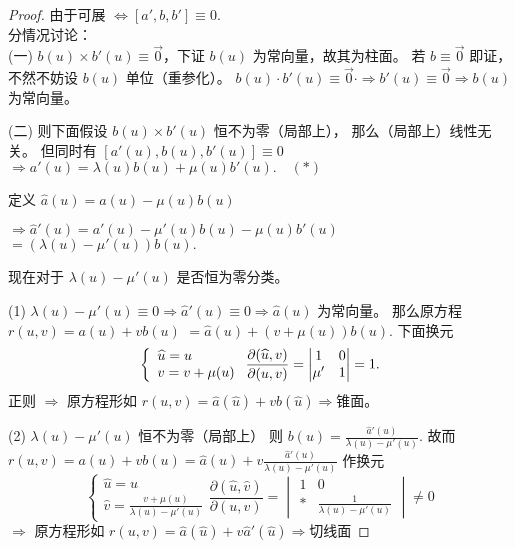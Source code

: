 \documentclass[lang=cn,10pt,thmcnt=section]{elegantbook}
\begin{document}
\begin{proof}
    由于可展 $\Leftrightarrow [a', b, b'] \equiv 0$. \\
分情况讨论： \\
(一) $b(u) \times b'(u) \equiv \overrightarrow{0}$，下证 $b(u)$ 为常向量，故其为柱面。 
若 $b \equiv \overrightarrow{0}$ 即证，不然不妨设 $b(u)$ 单位（重参化）。 
$b(u) \cdot b'(u) \equiv \overrightarrow{0} \cdot \Rightarrow b'(u) \equiv \overrightarrow{0} \Rightarrow b(u)$ 为常向量。

\vspace{1cm}

(二) 则下面假设 $b(u) \times b'(u)$ 恒不为零（局部上）， 
那么（局部上）线性无关。 
但同时有 $[a'(u), b(u), b'(u)] \equiv 0$ 
$\Rightarrow a'(u) = \lambda(u) b(u) + \mu(u) b'(u). \quad (*)$ 

定义 $\widehat{a}(u) = a(u) - \mu(u) b(u)$ 

$\Rightarrow \widehat{a}'(u) = a'(u) - \mu'(u) b(u) - \mu(u) b'(u)$ 
$= (\lambda(u) - \mu'(u)) b(u).$

现在对于 $\lambda(u) - \mu'(u)$ 是否恒为零分类。 

(1) $\lambda(u) - \mu'(u) \equiv 0 \Rightarrow \widehat{a}'(u) \equiv 0 \Rightarrow \widehat{a}(u)$ 为常向量。 
那么原方程 $r(u,v) = a(u) + vb(u)$ 
$= \widehat{a}(u) + (v + \mu(u)) b(u).$ 
下面换元 $$\left\{
\begin{array}{l}
\widehat{u} = u \\
v = v + \mu(u)
\end{array}
\right.\\
\frac{\partial (\widehat{u}, v)}{\partial (u, v)} = 
\begin{vmatrix}
1 & 0 \\
\mu' & 1
\end{vmatrix}
= 1.$$正则
 $\Rightarrow$ 原方程形如 $r(u,v) = \widehat{a}(\widehat{u}) + v b(\widehat{u}) \Rightarrow$锥面。

\vspace{1cm}

(2) $\lambda(u) - \mu'(u)$ 恒不为零（局部上） 
则 $b(u) = \frac{\widehat{a}'(u)}{\lambda(u) - \mu'(u)}$. 
故而 $r(u,v) = a(u) + vb(u) = \widehat{a}(u) + v \frac{\widehat{a}'(u)}{\lambda(u) - \mu'(u)}$ 
作换元 $$\left\{
\begin{array}{l}
\widehat{u} = u \\
\widehat{v} = \frac{v + \mu(u)}{\lambda(u) - \mu'(u)}
\end{array}
\right.
\frac{\partial (\widehat{u}, \widehat{v})}{\partial (u, v)} = 
\begin{vmatrix}
1 & 0 \\
* & \frac{1}{\lambda(u) - \mu'(u)}
\end{vmatrix}
\neq 0$$
$\Rightarrow$ 原方程形如 $r(u,v) = \widehat{a}(\widehat{u}) + v \widehat{a}'(\widehat{u}) \Rightarrow$切线面
\end{proof}
\end{document}
